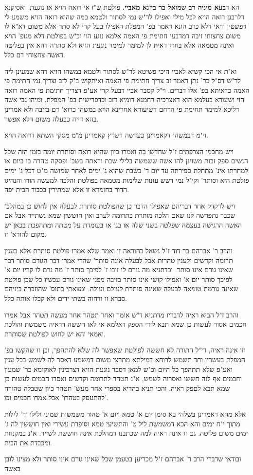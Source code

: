 \documentclass[12pt, openany]{book}
\begin{document}
{הא ד\textbf{בעא מיניה רב שמואל בר ביזנא מאביי.} פולטת ש"ז אי רואה הויא או נוגעת. ואסיקנא דלרבנן רואה הויא לכל מילי ואפילו לר"ש נמי לסתור ולטמא במה שהוא רואה הויא משמע לי דפשטין ודאי דלא כרב הונא דאמר בפ' המפלת דאפילו בעל קרי לא סתר אלא משום דא"א לו משום צחצוחי זיבה דמדבעי חתימת פי האמה אלמא נוגע הוי וכ"ש בפולטת דלא מגופ' הויא ואינה מטמאה אלא בחוץ דאית לן למימר למימר נוגעת הויא ולא סתרה דהא אין בפליטה דאשה צחצוחי דם כלל.\par וא"ת אי הכי קשיא לאביי היכי פשיטא לר"ש לסתור ולטמא במשהו הויא דהא שמעינן ליה לר"ש דס"ל כר' נתן דאמר זב צריך חתימת פי האמה ואיתקוש ב"ק לזב וצריך נמי חתימת פי האמה כדאיתא בפ' אלו דברים. וי"ל קסבר אביי דבעל קרי אע"פ דצריך חתימת פי האמה רואה הוי ושעורא בעלמא הוא דאצרכיה רחמנא דומיא דזב וכדפרישית בפ' המפלת. ומיהו גבי אשה דליכא למימר תחימת פי הרחם דשיעורא אחרינא הויא במשהו כרוא' דם בזיבה ולא אמרינן בהא דייה כבעלה משום דלא אפשר.\par וי"מ דבמשהו דקאמרינן כעדשה דשרץ קאמרינן מ"מ מסקי השתא דרואה הויא.\par ויש מחכמי הצרפתים ז"ל שחדשו בה ואמרו כיון שהיא רואה וסותרת יומה בזמן הזה שכל הנשים ספק זבות משוינן להו אשה ששמשה בלילי שבת וראתה בשב' ופסקה טהרה בו ביום או למחרתו אינ' מתחלת ספירתה עד יום ד' בשבת שהוא ג' ימים לאחר שמושה מ"ט דכל ג' ימים פולטת היא וסותר' וקי"ל נמי דשש עונות שלימות מטמאה בפולטת והלכה למעשה הורו והנהיגו הדור בחומרא זו אלא שמתירין בכבוד הבית יפה.\par ויש לדקדק אחר דבריהם שאפילו הדבר כן שהפולטת סותרת לבעלה אין לחוש כן במהלכ' שכבר נתפרשה לנו שאם הלכה מותרת בתרומה לערב ואין חוששין שמא נשתייר אבל אם האשה הרגישה בעצמה שפלטה בשני שלה או בג' או בעומדת על מטתה ומתהפכת בכאן יש מקום להורא' זו.\par והרב ר' אברהם בר דוד ז"ל נשאל בהוראה זו ואמר שלא אמרו פולטת סותרת אלא בענין תרומה וקדשים ולענין טהרות אבל לבעלה אינה סותר' שהרי אמרו דבר הגורם סותר דבר שאינו גורם אינו סותר. וכדתניא מה גורם לו זובו ז' לפיכך סותר ז' מה גרם לו קריו יום א' לפיכך סותר יום א' ואפילו קושי אינו סותר בזיבה מפני שאינו גורם עכשיו כל שכן פולטת שאינה גורמת טומאה לבעלה שאינה סותרת לעולם ועולה. ומצאתי בתוס' שהוזכרה ביניהם סברא זו ודחוה בשתי ידים ולא קבלו אותה כלל.\par והרב ז"ל הביא ראיה לדבריו מדתניא ד"ש אומר ואחר תטהר אחר מעשה תטהר אבל אמרו חכמים אסור לעשות כן שמא תבא לידי הספק דאלמא אי לאו חששה דראיה משמשת והולכת ואמאי והא יש לחוש לפולטת שסותרת.\par וזו אינה ראיה, די"ל התורה לא חששה לפולטת שאפשר לה שלא להתהפך, וכן זו שהקשו בפ' המפלת בעשרין וחד תשמש לרוחא דמילתא מתרצי משום דמשמע דאסר לה לשמש בכל ענין ואע"פ שלא תתהפך כל היום וכ"ש למאן דסבר נוגעת הויא דצרכינין לאוקומא כר' שמעון וחכמים אף לזה חששו ואסרוה לשמש, א"נ תטהר לתרומה וקדשים ואסרו חכמים לעשות כן שמא תבא לםפק ראיה. והכי תניא בהדיא בספרי אחר מעש' תטהר כיון שטבלה טהורה להתעסק בטהרו' אבל אמרו חכמים וכו'.\par אלא מהא דאמרינן בשלהי בא סימן יום א' טמא ויום א' טהור משמשות שמיני ולילו וד' לילות מתוך י"ח ימים והא הכא דמשמשת ליל ט' והתשיעי טמא וסופרת עשירי ואין חוששין לה ג' ימים משום פליטה. גם זו אינה ראיה למה שכתבנו דמהלכת אינה חוששת לשייר. א"נ במקנחת ומכבדת את הבית.\par ובודאי שדברי הרב ר' אברהם ז"ל מכריען בטעמן שכל שאינו גורם אינו סותר ולא מצינו לובן באשה }
\end{document}
